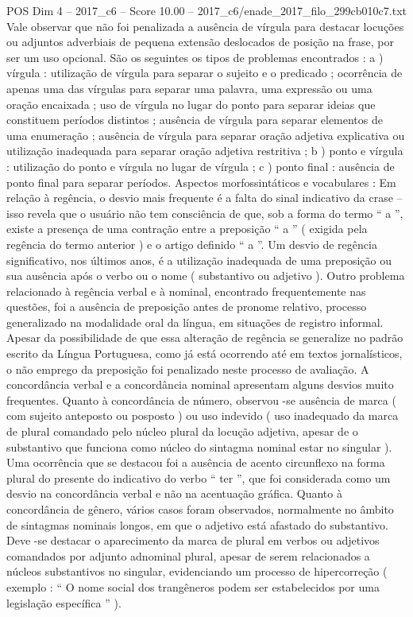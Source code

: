 \begin{textsample}{POS Dim 4 – 2017\_c6 – Score 10.00 – 2017\_c6/enade\_2017\_filo\_299cb010c7.txt}
Vale observar que não foi penalizada a ausência de vírgula para destacar locuções ou adjuntos adverbiais de pequena extensão deslocados de posição na frase, por ser um uso opcional.
São os seguintes os tipos de problemas encontrados : a ) vírgula : utilização de vírgula para separar o sujeito e o predicado ; ocorrência de apenas uma das vírgulas para separar uma palavra, uma expressão ou uma oração encaixada ; uso de vírgula no lugar do ponto para separar ideias que constituem períodos distintos ; ausência de vírgula para separar elementos de uma enumeração ; ausência de vírgula para separar oração adjetiva explicativa ou utilização inadequada para separar oração adjetiva restritiva ; b ) ponto e vírgula : utilização do ponto e vírgula no lugar de vírgula ; c ) ponto final : ausência de ponto final para separar períodos.
Aspectos morfossintáticos e vocabulares : Em relação à regência, o desvio mais frequente é a falta do sinal indicativo da crase – isso revela que o usuário não tem consciência de que, sob a forma do termo “ a ”, existe a presença de uma contração entre a preposição “ a ” ( exigida pela regência do termo anterior ) e o artigo definido “ a ”.
Um desvio de regência significativo, nos últimos anos, é a utilização inadequada de uma preposição ou sua ausência após o verbo ou o nome ( substantivo ou adjetivo ).
Outro problema relacionado à regência verbal e à nominal, encontrado frequentemente nas questões, foi a ausência de preposição antes de pronome relativo, processo generalizado na modalidade oral da língua, em situações de registro informal.
Apesar da possibilidade de que essa alteração de regência se generalize no padrão escrito da Língua Portuguesa, como já está ocorrendo até em textos jornalísticos, o não emprego da preposição foi penalizado neste processo de avaliação.
A concordância verbal e a concordância nominal apresentam alguns desvios muito frequentes.
Quanto à concordância de número, observou -se ausência de marca ( com sujeito anteposto ou posposto ) ou uso indevido ( uso inadequado da marca de plural comandado pelo núcleo plural da locução adjetiva, apesar de o substantivo que funciona como núcleo do sintagma nominal estar no singular ).
Uma ocorrência que se destacou foi a ausência de acento circunflexo na forma plural do presente do indicativo do verbo “ ter ”, que foi considerada como um desvio na concordância verbal e não na acentuação gráfica.
Quanto à concordância de gênero, vários casos foram observados, normalmente no âmbito de sintagmas nominais longos, em que o adjetivo está afastado do substantivo.
Deve -se destacar o aparecimento da marca de plural em verbos ou adjetivos comandados por adjunto adnominal plural, apesar de serem relacionados a núcleos substantivos no singular, evidenciando um processo de hipercorreção ( exemplo : “ O nome social dos trangêneros podem ser estabelecidos por uma legislação específica ” ).

\end{textsample}
